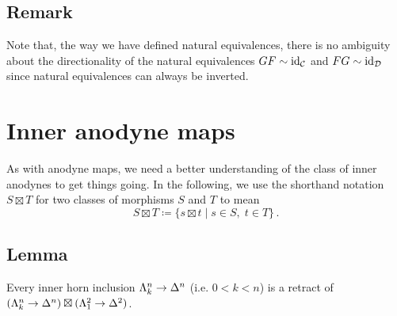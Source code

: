     \subsection{Remark}\label{chVI-1-7}
        Note that, the way we have defined natural equivalences, there is no ambiguity about the directionality of the natural equivalences $GF \sim \operatorname{id}_{\mathcal{C}}$ and $FG \sim \operatorname{id}_{\mathcal{D}}$ since natural equivalences can always be inverted.

\section{Inner anodyne maps}\label{chVI-2}
    As with anodyne maps, we need a better understanding of the class of inner anodynes to get things going. In the following, we use the shorthand notation $S \boxtimes T$ for two classes of morphisms $S$ and $T$ to mean
    \begin{equation*}
        S \boxtimes T \coloneq \{ s \boxtimes t \mid s \in S, \; t \in T \} \,.
    \end{equation*}

    \subsection{Lemma}\label{chVI-2-1}
        Every inner horn inclusion $\Lambda^{n}_{k} \to \Delta^n$ (i.e. $0 < k <n$) is a retract of $(\Lambda^{n}_{k} \to \Delta^n) \boxtimes (\Lambda^{2}_{1} \to \Delta^2)$.
        \smallskip

